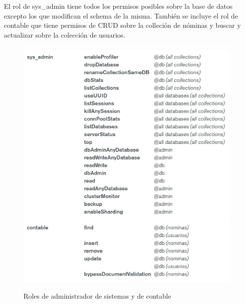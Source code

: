 \documentclass[10pt,a4paper]{article}
\begin{document}
El rol de sys\_admin tiene todos los permisos posibles sobre la base de datos excepto los que modifican el schema de la misma. También se incluye el rol de contable que tiene permisos de CRUD sobre la colleción de nóminas y buscar y actualizar sobre la colección de usuarios.
\begin{figure}[h!]
  \centering
  \includegraphics[scale=0.5]{roles.png}\\
  \caption{Roles de administrador de sistemas y de contable}
  \label{fig:select}
\end{figure}

\pagebreak
\end{document}

